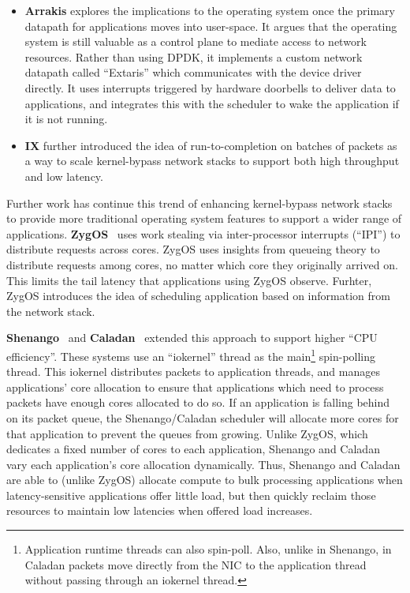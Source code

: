 \begin{itemize}
\item \textbf{Arrakis} explores the implications to the operating system once the primary datapath for applications moves into user-space. It argues that the operating system is still valuable as a control plane to mediate access to network resources. Rather than using DPDK, it implements a custom network datapath called ``Extaris'' which communicates with the device driver directly. 
It uses interrupts triggered by hardware doorbells to deliver data to applications, and integrates this with the scheduler to wake the application if it is not running.
\item \textbf{IX} further introduced the idea of run-to-completion on batches of packets as a way to scale kernel-bypass network stacks to support both high throughput and low latency.
\end{itemize}

Further work has continue this trend of enhancing kernel-bypass network stacks to provide more traditional operating system features to support a wider range of applications.
\textbf{ZygOS}~\cite{zygos} uses work stealing via inter-processor interrupts (``IPI'') to distribute requests across cores. ZygOS uses insights from queueing theory to distribute requests among cores, no matter which core they originally arrived on. This limits the tail latency that applications using ZygOS observe. Furhter, ZygOS introduces the idea of scheduling application based on information from the network stack.

\textbf{Shenango}~\cite{shenango} and \textbf{Caladan}~\cite{caladan} extended this approach to support higher ``CPU efficiency''. These systems use an ``iokernel'' thread as the main\footnote{Application runtime threads can also spin-poll. Also, unlike in Shenango, in Caladan packets move directly from the NIC to the application thread without passing through an iokernel thread.} spin-polling thread. 
This iokernel distributes packets to application threads, and manages applications' core allocation to ensure that applications which need to process packets have enough cores allocated to do so.
If an application is falling behind on its packet queue, the Shenango/Caladan scheduler will allocate more cores for that application to prevent the queues from growing.
Unlike ZygOS, which dedicates a fixed number of cores to each application, Shenango and Caladan vary each application's core allocation dynamically.
Thus, Shenango and Caladan are able to (unlike ZygOS) allocate compute to bulk processing applications when latency-sensitive applications offer little load, but then quickly reclaim those resources to maintain low latencies when offered load increases.

